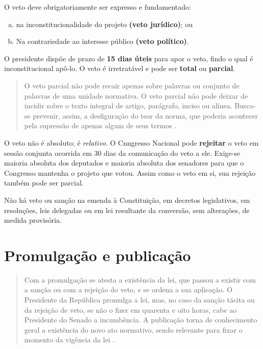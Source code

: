 \documentclass{article}
\begin{document}
O veto deve obrigatoriamente ser expresso e fundamentado:

\begin{enumerate}[(a)]
    \item na inconstitucionalidade do projeto \textbf{(veto jurídico)}; ou
    \item Na contrariedade ao interesse público \textbf{(veto político)}.
\end{enumerate}

O presidente dispõe de prazo de \textbf{15 dias úteis} para apor o veto, findo o qual é inconstitucional apô-lo. O veto é irretratável e pode ser \textbf{total} ou \textbf{parcial}.

\begin{quote}
    O veto parcial não pode recair apenas sobre palavras ou conjunto de palavras de uma unidade normativa. O veto parcial não pode deixar de incidir sobre o texto integral de artigo, parágrafo, inciso ou alínea. Busca-se prevenir, assim, a desfiguração do teor da norma, que poderia acontecer pela supressão de apenas algum de seus termos \cite[p.~1062]{mendes_curso_2024}.
\end{quote}

O veto não é absoluto; é \textit{relativo}. O Cnngresso Nacional pode \textbf{rejeitar} o veto em sessão conjunta ocorrida em 30 dias da comunicação do veto a ele. Exige-se maioria absoluta dos deputados e maioria absoluta dos senadores para que o Congresso mantenha o projeto que votou. Assim como o veto em si, sua rejeição também pode ser parcial.

Não há veto ou sanção na emenda à Constituição, em decretos legislativos, em resoluções, leis delegadas ou em lei resultante da conversão, sem alterações, de medida provisória.

\section{Promulgação e publicação}

\begin{quote}
    Com a promulgação se atesta a existência da lei, que passou a existir com a sanção ou com a rejeição do veto, e se ordena a sua aplicação. O Presidente da República promulga a lei, mas, no caso da sanção tácita ou da rejeição de veto, se não o fizer em quarenta e oito horas, cabe ao Presidente do Senado a incumbência. A publicação torna de conhecimento geral a existência do novo ato normativo, sendo relevante para fixar o momento da vigência da lei \cite[p.~1064]{mendes_curso_2024}.
\end{quote}
\end{document}
